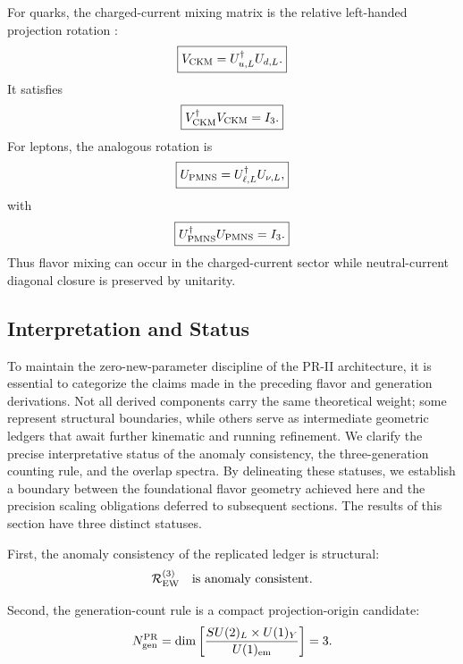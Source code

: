 \documentclass[11pt]{article}
\begin{document}
For quarks, the charged-current mixing matrix is the relative left-handed projection rotation \cite{MakiNakagawaSakata1962}:
\begin{equation}
\boxed{
V_{\rm CKM}
=
U_{u,L}^{\dagger}U_{d,L}.
}
\end{equation}
It satisfies
\begin{equation}
\boxed{
V_{\rm CKM}^{\dagger}V_{\rm CKM}
=
I_3.
}
\end{equation}
For leptons, the analogous rotation is
\begin{equation}
\boxed{
U_{\rm PMNS}
=
U_{\ell,L}^{\dagger}U_{\nu,L},
}
\end{equation}
with
\begin{equation}
\boxed{
U_{\rm PMNS}^{\dagger}U_{\rm PMNS}
=
I_3.
}
\end{equation}
Thus flavor mixing can occur in the charged-current sector while neutral-current diagonal closure is preserved by unitarity.

\subsection{Interpretation and Status}
\label{sec:pr2_generation_flavor_interpretation_status}

To maintain the zero-new-parameter discipline of the PR-II architecture, it is essential to categorize the claims made in the preceding flavor and generation derivations. Not all derived components carry the same theoretical weight; some represent structural boundaries, while others serve as intermediate geometric ledgers that await further kinematic and running refinement. We clarify the precise interpretative status of the anomaly consistency, the three-generation counting rule, and the overlap spectra. By delineating these statuses, we establish a boundary between the foundational flavor geometry achieved here and the precision scaling obligations deferred to subsequent sections. The results of this section have three distinct statuses.

First, the anomaly consistency of the replicated ledger is structural:
\begin{equation}
\mathcal R_{\rm EW}^{(3)}
\quad
\text{is anomaly consistent}.
\end{equation}

Second, the generation-count rule is a compact projection-origin candidate:
\begin{equation}
N_{\rm gen}^{\rm PR}
=
\dim
\left[
\frac{
SU(2)_L\times U(1)_Y
}{
U(1)_{\rm em}
}
\right]
=
3.
\end{equation}
\end{document}
